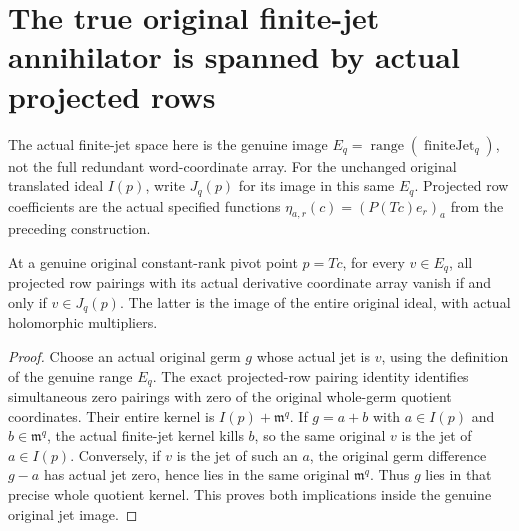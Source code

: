 \section{The true original finite-jet annihilator is spanned by actual projected rows}

The actual finite-jet space here is the genuine image
$E_q=\operatorname{range}(\operatorname{finiteJet}_q)$, not the full
redundant word-coordinate array. For the unchanged original translated
ideal $I(p)$, write $J_q(p)$ for its image in this same $E_q$.
Projected row coefficients are the actual specified functions
$\eta_{a,r}(c)=(P(Tc)e_r)_a$ from the preceding construction.

\begin{theorem}
\label{hir:actual-projected-dual-rows-separate-true-jet-ideal-image}
\leanok
At a genuine original constant-rank pivot point $p=Tc$, for every
$v\in E_q$, all projected row pairings with its actual derivative
coordinate array vanish if and only if $v\in J_q(p)$. The latter is
the image of the entire original ideal, with actual holomorphic
multipliers.
\end{theorem}
\begin{proof}
Choose an actual original germ $g$ whose actual jet is $v$, using the
definition of the genuine range $E_q$. The exact projected-row pairing
identity identifies simultaneous zero pairings with zero of the
original whole-germ quotient coordinates. Their entire kernel is
$I(p)+\mathfrak m^q$. If $g=a+b$ with $a\in I(p)$ and
$b\in\mathfrak m^q$, the actual finite-jet kernel kills $b$, so the
same original $v$ is the jet of $a\in I(p)$. Conversely, if $v$ is the
jet of such an $a$, the original germ difference $g-a$ has actual jet
zero, hence lies in the same original $\mathfrak m^q$. Thus $g$ lies
in that precise whole quotient kernel. This proves both implications
inside the genuine original jet image.
\end{proof}

